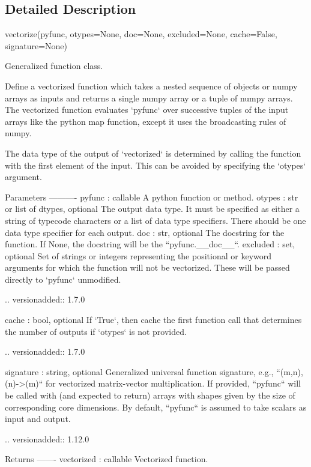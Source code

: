 \subsection{Detailed Description}
\begin{DoxyVerb}vectorize(pyfunc, otypes=None, doc=None, excluded=None, cache=False,
          signature=None)

Generalized function class.

Define a vectorized function which takes a nested sequence of objects or
numpy arrays as inputs and returns a single numpy array or a tuple of numpy
arrays. The vectorized function evaluates `pyfunc` over successive tuples
of the input arrays like the python map function, except it uses the
broadcasting rules of numpy.

The data type of the output of `vectorized` is determined by calling
the function with the first element of the input.  This can be avoided
by specifying the `otypes` argument.

Parameters
----------
pyfunc : callable
    A python function or method.
otypes : str or list of dtypes, optional
    The output data type. It must be specified as either a string of
    typecode characters or a list of data type specifiers. There should
    be one data type specifier for each output.
doc : str, optional
    The docstring for the function. If None, the docstring will be the
    ``pyfunc.__doc__``.
excluded : set, optional
    Set of strings or integers representing the positional or keyword
    arguments for which the function will not be vectorized.  These will be
    passed directly to `pyfunc` unmodified.

    .. versionadded:: 1.7.0

cache : bool, optional
    If `True`, then cache the first function call that determines the number
    of outputs if `otypes` is not provided.

    .. versionadded:: 1.7.0

signature : string, optional
    Generalized universal function signature, e.g., ``(m,n),(n)->(m)`` for
    vectorized matrix-vector multiplication. If provided, ``pyfunc`` will
    be called with (and expected to return) arrays with shapes given by the
    size of corresponding core dimensions. By default, ``pyfunc`` is
    assumed to take scalars as input and output.

    .. versionadded:: 1.12.0

Returns
-------
vectorized : callable
    Vectorized function.


\end{DoxyVerb}
